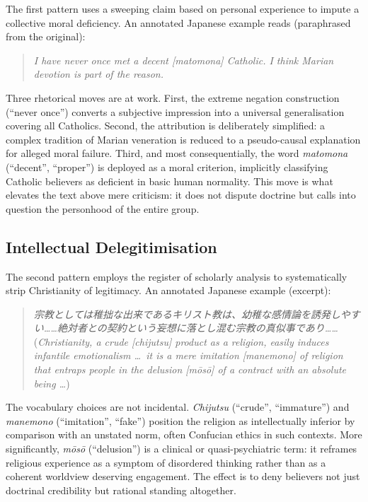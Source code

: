 \documentclass[../CLthesis.tex]{subfiles}
\begin{document}
The first pattern uses a sweeping claim based on personal experience to impute a collective moral deficiency. An annotated Japanese example reads (paraphrased from the original):

\begin{quote}
\textit{I have never once met a decent [\textit{matomona}] Catholic. I think Marian devotion is part of the reason.}
\end{quote}

Three rhetorical moves are at work. First, the extreme negation construction (``never once'') converts a subjective impression into a universal generalisation covering all Catholics. Second, the attribution is deliberately simplified: a complex tradition of Marian veneration is reduced to a pseudo-causal explanation for alleged moral failure. Third, and most consequentially, the word \textit{matomona} (``decent'', ``proper'') is deployed as a moral criterion, implicitly classifying Catholic believers as deficient in basic human normality. This move is what elevates the text above mere criticism: it does not dispute doctrine but calls into question the personhood of the entire group.

\subsection{Intellectual Delegitimisation}
\label{subsec:pattern-delegitimisation}

The second pattern employs the register of scholarly analysis to systematically strip Christianity of legitimacy. An annotated Japanese example (excerpt):

\begin{quote}
\textit{宗教としては稚拙な出来であるキリスト教は、幼稚な感情論を誘発しやすい……絶対者との契約という妄想に落とし混む宗教の真似事であり……} \\
(\textit{Christianity, a crude [\textit{chijutsu}] product as a religion, easily induces infantile emotionalism \ldots\ it is a mere imitation [\textit{manemono}] of religion that entraps people in the delusion [\textit{m\={o}s\={o}}] of a contract with an absolute being \ldots})
\end{quote}

The vocabulary choices are not incidental. \textit{Chijutsu} (``crude'', ``immature'') and \textit{manemono} (``imitation'', ``fake'') position the religion as intellectually inferior by comparison with an unstated norm, often Confucian ethics in such contexts. More significantly, \textit{m\={o}s\={o}} (``delusion'') is a clinical or quasi-psychiatric term: it reframes religious experience as a symptom of disordered thinking rather than as a coherent worldview deserving engagement. The effect is to deny believers not just doctrinal credibility but rational standing altogether.
\end{document}
